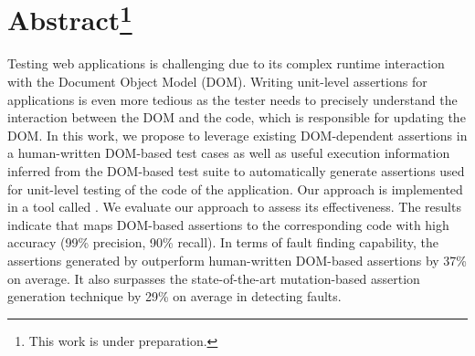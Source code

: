 \section*{Abstract\footnote{This work is under preparation.}}
Testing \javascript web applications is challenging due to its complex runtime interaction with the Document Object Model (DOM). Writing unit-level assertions for \javascript applications is even more tedious as the tester needs to precisely understand the interaction between the DOM and the \javascript code, which is responsible for updating the DOM. In this work, we propose to leverage existing DOM-dependent assertions in a human-written DOM-based test cases as well as useful execution information inferred from the DOM-based test suite to automatically generate assertions used for unit-level testing of the \javascript code of the application. Our approach is implemented in a tool called \atrina. We evaluate our approach to assess its effectiveness. The results indicate that \atrina maps DOM-based assertions to the corresponding \javascript code with high accuracy (99\% precision, 90\% recall). In terms of fault finding capability, the assertions generated by \atrina outperform human-written DOM-based assertions by 37\% on average. It also surpasses the state-of-the-art mutation-based assertion generation technique by 29\% on average in detecting faults.